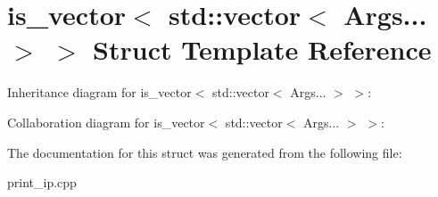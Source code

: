 \hypertarget{structis__vector_3_01std_1_1vector_3_01_args_8_8_8_01_4_01_4}{}\section{is\+\_\+vector$<$ std\+:\+:vector$<$ Args... $>$ $>$ Struct Template Reference}
\label{structis__vector_3_01std_1_1vector_3_01_args_8_8_8_01_4_01_4}


Inheritance diagram for is\+\_\+vector$<$ std\+:\+:vector$<$ Args... $>$ $>$\+:


Collaboration diagram for is\+\_\+vector$<$ std\+:\+:vector$<$ Args... $>$ $>$\+:


The documentation for this struct was generated from the following file\+:\begin{DoxyCompactItemize}
\item 
print\+\_\+ip.\+cpp\end{DoxyCompactItemize}
